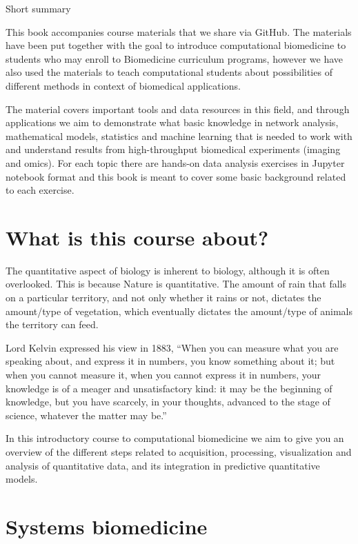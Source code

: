 \documentclass[
]{book}
\begin{document}
Short summary

This book accompanies course materials that we share via GitHub. The materials have been put together with the goal to introduce computational biomedicine to students who may enroll to Biomedicine curriculum programs, however we have also used the materials to teach computational students about possibilities of different methods in context of biomedical applications.

The material covers important tools and data resources in this field, and through applications we aim to demonstrate what basic knowledge in network analysis, mathematical models, statistics and machine learning that is needed to work with and understand results from high-throughput biomedical experiments (imaging and omics). For each topic there are hands-on data analysis exercises in Jupyter notebook format and this book is meant to cover some basic background related to each exercise.

\hypertarget{what-is-this-course-about}{%
\section{What is this course about?}\label{what-is-this-course-about}}

The quantitative aspect of biology is inherent to biology, although it is often overlooked. This is because Nature is quantitative. The amount of rain that falls on a particular territory, and not only whether it rains or not, dictates the amount/type of vegetation, which eventually dictates the amount/type of animals the territory can feed.

Lord Kelvin expressed his view in 1883, ``When you can measure what you are speaking about, and express it in numbers, you know something about it;
but when you cannot measure it, when you cannot express it in numbers, your knowledge is of a meager and unsatisfactory kind:
it may be the beginning of knowledge, but you have scarcely, in your thoughts, advanced to the stage of science, whatever the matter may be.''

In this introductory course to computational biomedicine we aim to give you an overview of the different steps related to acquisition, processing, visualization and analysis of quantitative data, and its integration in predictive quantitative models.

\hypertarget{systems-biomedicine}{%
\section{Systems biomedicine}\label{systems-biomedicine}}
\end{document}
